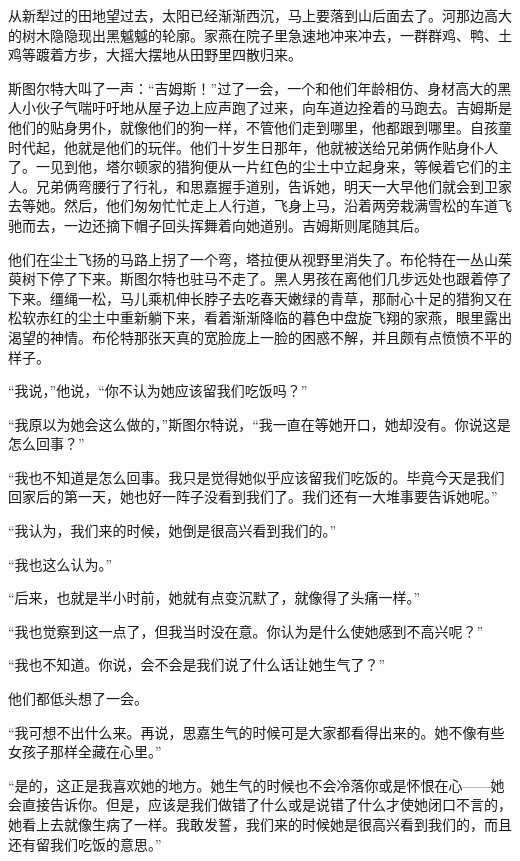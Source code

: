 \par 从新犁过的田地望过去，太阳已经渐渐西沉，马上要落到山后面去了。河那边高大的树木隐隐现出黑魆魆的轮廓。家燕在院子里急速地冲来冲去，一群群鸡、鸭、土鸡等踱着方步，大摇大摆地从田野里四散归来。
\par 斯图尔特大叫了一声：“吉姆斯！”过了一会，一个和他们年龄相仿、身材高大的黑人小伙子气喘吁吁地从屋子边上应声跑了过来，向车道边拴着的马跑去。吉姆斯是他们的贴身男仆，就像他们的狗一样，不管他们走到哪里，他都跟到哪里。自孩童时代起，他就是他们的玩伴。他们十岁生日那年，他就被送给兄弟俩作贴身仆人了。一见到他，塔尔顿家的猎狗便从一片红色的尘土中立起身来，等候着它们的主人。兄弟俩弯腰行了行礼，和思嘉握手道别，告诉她，明天一大早他们就会到卫家去等她。然后，他们匆匆忙忙走上人行道，飞身上马，沿着两旁栽满雪松的车道飞驰而去，一边还摘下帽子回头挥舞着向她道别。吉姆斯则尾随其后。
\par 他们在尘土飞扬的马路上拐了一个弯，塔拉便从视野里消失了。布伦特在一丛山茱萸树下停了下来。斯图尔特也驻马不走了。黑人男孩在离他们几步远处也跟着停了下来。缰绳一松，马儿乘机伸长脖子去吃春天嫩绿的青草，那耐心十足的猎狗又在松软赤红的尘土中重新躺下来，看着渐渐降临的暮色中盘旋飞翔的家燕，眼里露出渴望的神情。布伦特那张天真的宽脸庞上一脸的困惑不解，并且颇有点愤愤不平的样子。
\par “我说，”他说，“你不认为她应该留我们吃饭吗？”
\par “我原以为她会这么做的，”斯图尔特说，“我一直在等她开口，她却没有。你说这是怎么回事？”
\par “我也不知道是怎么回事。我只是觉得她似乎应该留我们吃饭的。毕竟今天是我们回家后的第一天，她也好一阵子没看到我们了。我们还有一大堆事要告诉她呢。”
\par “我认为，我们来的时候，她倒是很高兴看到我们的。”
\par “我也这么认为。”
\par “后来，也就是半小时前，她就有点变沉默了，就像得了头痛一样。”
\par “我也觉察到这一点了，但我当时没在意。你认为是什么使她感到不高兴呢？”
\par “我也不知道。你说，会不会是我们说了什么话让她生气了？”
\par 他们都低头想了一会。
\par “我可想不出什么来。再说，思嘉生气的时候可是大家都看得出来的。她不像有些女孩子那样全藏在心里。”
\par “是的，这正是我喜欢她的地方。她生气的时候也不会冷落你或是怀恨在心——她会直接告诉你。但是，应该是我们做错了什么或是说错了什么才使她闭口不言的，她看上去就像生病了一样。我敢发誓，我们来的时候她是很高兴看到我们的，而且还有留我们吃饭的意思。”
